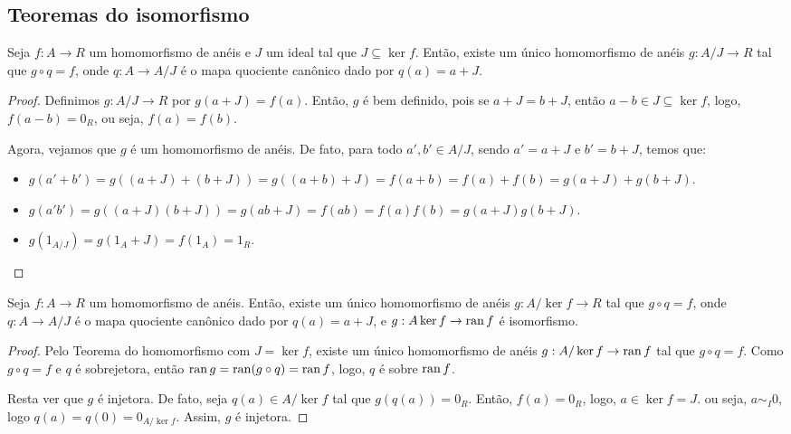 \subsection{Teoremas do isomorfismo}
\begin{theorem}
    Seja $f:A\rightarrow R$ um homomorfismo de anéis e $J$ um ideal tal que $J\subseteq \ker f$. Então, existe um único homomorfismo de anéis $g:A/J\rightarrow R$ tal que $g\circ q=f$, onde $q:A\rightarrow A/J$ é o mapa quociente canônico dado por $q(a)=a+J$.
\end{theorem}
\begin{proof}
    Definimos $g:A/J\rightarrow R$ por $g(a+J)=f(a)$. Então, $g$ é bem definido, pois se $a+J=b+J$, então $a-b \in J\subseteq \ker f$, logo, $f(a-b)=0_R$, ou seja, $f(a)=f(b)$.

    Agora, vejamos que $g$ é um homomorfismo de anéis. De fato, para todo $a', b' \in A/J$, sendo $a'=a+J$ e $b'=b+J$, temos que:
    \begin{itemize}
        \item $g(a'+b')=g((a+J)+(b+J))=g((a+b)+J)=f(a+b)=f(a)+f(b)=g(a+J)+g(b+J)$.
        \item $g(a'b')=g((a+J)(b+J))=g(ab+J)=f(ab)=f(a)f(b)=g(a+J)g(b+J)$.
        \item $g(1_{A/J})=g(1_A+J)=f(1_A)=1_R$.
    \end{itemize}
\end{proof}

\begin{theorem}
    Seja $f:A\rightarrow R$ um homomorfismo de anéis. Então, existe um único homomorfismo de anéis $g:A/\ker f\rightarrow R$ tal que $g\circ q=f$, onde $q:A\rightarrow A/J$ é o mapa quociente canônico dado por $q(a)=a+J$, e $g:A\ker f\rightarrow \operatorname{ran} f$ é isomorfismo.
\end{theorem}
\begin{proof}
    Pelo Teorema do homomorfismo com $J=\ker f$, existe um único homomorfismo de anéis $g:A/\ker f\rightarrow \operatorname{ran} f$ tal que $g\circ q=f$. Como $g\circ q=f$ e $q$ é sobrejetora, então $\operatorname{ran} g=\operatorname{ran} (g\circ q)=\operatorname{ran} f$, logo, $q$ é sobre $\operatorname{ran} f$.
    
    Resta ver que $g$ é injetora. De fato, seja $q(a)\in A/\ker f$ tal que $g(q(a))=0_R$. Então, $f(a)=0_R$, logo, $a\in \ker f=J$. ou seja, $a\sim_I 0$, logo $q(a)=q(0)=0_{A/\ker f}$. Assim, $g$ é injetora.
\end{proof}